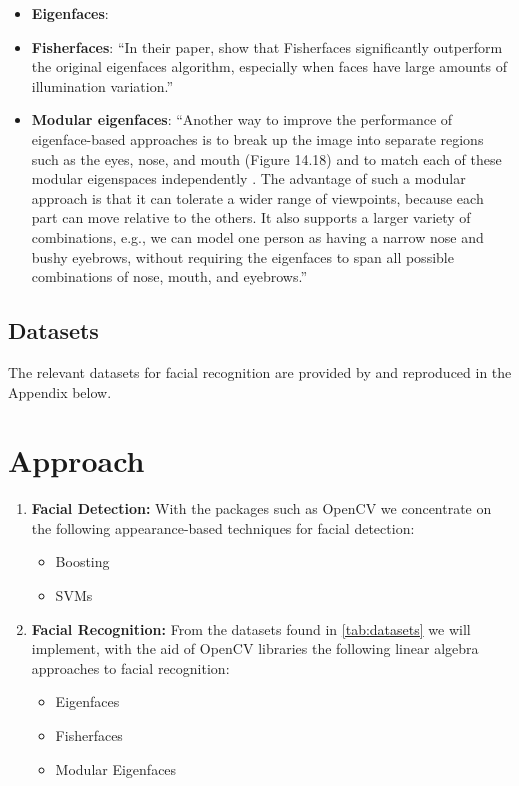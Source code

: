 \documentclass[11pt]{article} %
\theoremstyle{plain}
\theoremstyle{definition}
\theoremstyle{remark}
\numberwithin{equation}{section} %
\numberwithin{figure}{section} %
\numberwithin{table}{section} %
\begin{document}
\begin{itemize}
  \item \textbf{Eigenfaces}: \citep{turk1991eigenfaces,turk1991face}
  \item \textbf{Fisherfaces}: ``In their paper, \citep{belhumeur1997eigenfaces} show that Fisherfaces significantly outperform the original eigenfaces algorithm, especially when faces have large amounts of illumination variation.''
  \item \textbf{Modular eigenfaces}: ``Another way to improve the performance of eigenface-based approaches is to break up the image into separate regions such as the eyes, nose, and mouth (Figure 14.18) and to match each of these modular eigenspaces independently \citep{pentland1994view}. The advantage of such a modular approach is that it can tolerate a wider range of viewpoints, because each part can move relative to the others. It also supports a larger variety of combinations, e.g., we can model one person as having a narrow nose and bushy eyebrows, without requiring the eigenfaces to span all possible combinations of nose, mouth, and eyebrows.''
\end{itemize}

\subsection{Datasets}

The relevant datasets for facial recognition are provided by 
\citep[p.~719]{szeliski2010computer} and reproduced in the Appendix below.

\section{Approach}

\begin{enumerate}
\item \textbf{Facial Detection:} With the packages such as OpenCV we concentrate on the following appearance-based techniques for facial detection:
  \begin{itemize}
    \item Boosting
    \item SVMs
  \end{itemize}

    \item \textbf{Facial Recognition:} From the datasets found in \cref{tab:datasets} we will implement, with the aid of OpenCV libraries the following linear algebra approaches to facial recognition:
    \begin{itemize}
      \item Eigenfaces
      \item Fisherfaces
      \item Modular Eigenfaces
    \end{itemize}
\end{enumerate}
\end{document}
